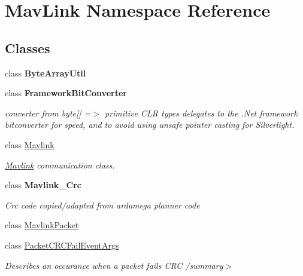 \hypertarget{namespaceMavLink}{}\section{Mav\+Link Namespace Reference}
\label{namespaceMavLink}
\subsection*{Classes}
\begin{DoxyCompactItemize}
\item 
class {\bfseries Byte\+Array\+Util}
\item 
class {\bfseries Framework\+Bit\+Converter}
\begin{DoxyCompactList}\small\item\em converter from byte\mbox{[}\mbox{]} =$>$ primitive C\+LR types delegates to the .Net framework bitconverter for speed, and to avoid using unsafe pointer casting for Silverlight. \end{DoxyCompactList}\item 
class \hyperlink{classMavLink_1_1Mavlink}{Mavlink}
\begin{DoxyCompactList}\small\item\em \hyperlink{classMavLink_1_1Mavlink}{Mavlink} communication class. \end{DoxyCompactList}\item 
class {\bfseries Mavlink\+\_\+\+Crc}
\begin{DoxyCompactList}\small\item\em Crc code copied/adapted from ardumega planner code \end{DoxyCompactList}\item 
class \hyperlink{classMavLink_1_1MavlinkPacket}{Mavlink\+Packet}
\item 
class \hyperlink{classMavLink_1_1PacketCRCFailEventArgs}{Packet\+C\+R\+C\+Fail\+Event\+Args}
\begin{DoxyCompactList}\small\item\em Describes an occurance when a packet fails C\+RC /summary$>$ \end{DoxyCompactList}\end{DoxyCompactItemize}
